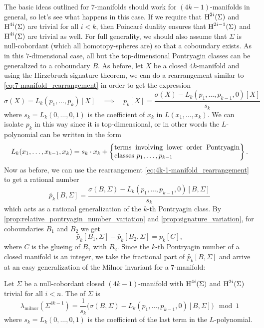 The basic ideas outlined for $7$-manifolds should work for $(4k-1)$-manifolds in general, so let's see what happens in this case. If we require that $\operatorname{H}^{2i}(\Sigma)$ and $\operatorname{H}^{4i}(\Sigma)$ are trivial for all $i<k$, then Poincar\'e duality ensures that $\operatorname{H}^{2i-1}(\Sigma)$ and $\operatorname{H}^{4i}(\Sigma)$ are trivial as well. For full generality, we should also assume that $\Sigma$ is null-cobordant (which all homotopy-spheres are) so that a coboundary exists.
As in this $7$-dimensional case, all but the top-dimensional Pontryagin classes can be generalized to a coboundary $B$.
As before, let $X$ be a closed $4k$-manifold and using the Hirzebruch signature theorem, we can do a rearrangement similar to \cref{eq:7-manifold_rearrangement} in order to get the expression
\begin{equation}\label{eq:4k-1-manifold_rearrangement}
	\sigma(X) = L_k(p_1, \ldots, p_k)[X]\quad\implies\quad
	p_k[X] = \frac{\sigma(X) - L_k(p_1,\ldots, p_{k-1}, 0)[X]}{s_k}
\end{equation}
where $s_k=L_k(0,\ldots, 0, 1)$ is the coefficient of $x_k$ in $L(x_1,\ldots, x_k)$.
We can isolate $p_k$ in this way since it is top-dimensional, or in other words the $L$-polynomial can be written in the form
\[
	L_k(x_1,\ldots, x_{k-1}, x_k) = s_k\cdot x_k +
	\left\{\parbox{18em}{terms involving lower order Pontryagin classes $p_1,\ldots, p_{k-1}$}\right\}.
\]
Now as before, we can use the rearrangement \cref{eq:4k-1-manifold_rearrangement} to get a rational number
\[
	\widetilde{p_k}[B, \Sigma] = \frac{\sigma(B, \Sigma) - L_k(p_1,\ldots, p_{k-1}, 0)[B,\Sigma]}{s_k}
\]
which acts as a rational generalization of the $k$-th Pontryagin class. By \cref{prop:relative_pontryagin_number_variation} and \cref{prop:signature_variation}, for coboundaries $B_1$ and $B_2$ we get
\[
	\widetilde{p_k}[B_1, \Sigma] - \widetilde{p_k}[B_2, \Sigma] = p_k[C],
\]
where $C$ is the glueing of $B_1$ with $B_2$. Since the $k$-th Pontryagin number of a closed manifold is an integer, we take the fractional part of $\widetilde{p_k}[B,\Sigma]$ and arrive at an easy generalization of the Milnor invariant for a $7$-manifold:

\begin{definition}
	Let $\Sigma$ be a null-cobordant closed $(4k-1)$-manifold with $\operatorname{H}^{4i}(\Sigma)$ and $\operatorname{H}^{2i}(\Sigma)$ trivial for all $i<n$. The  of $\Sigma$ is
	\[
		\boxed{
			\lambda_{\mathrm{milnor}}(\Sigma^{4k-1}) = \frac{1}{s_k}\Big(\sigma(B, \Sigma) - L_k(p_1, \ldots, p_{k-1},0)[B,\Sigma]\Big)\mod 1
		}
	\]
	where $s_k = L_k(0,\ldots,0,1)$ is the coefficient of the last term in the $L$-polynomial.
\end{definition}


